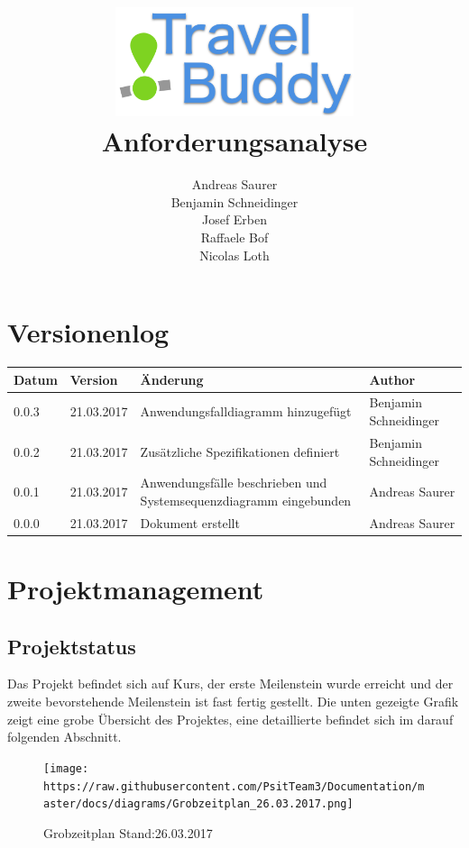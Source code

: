 \documentclass[ngerman,]{article}
\title{\includegraphics[width=7cm]{travel-buddy_white.png}\\Anforderungsanalyse}
\author{Andreas Saurer \\ Benjamin Schneidinger \\ Josef Erben \\ Raffaele Bof \\ Nicolas Loth}
\date{\parbox{\linewidth}{\centering%
      IT15TA ZH \hspace*{3cm} Gruppe 3\endgraf\bigskip
      28.03.2017\endgraf
    }}
\begin{document}
\maketitle
\newpage

{
\hypersetup{linkcolor=black}
\setcounter{tocdepth}{3}
\tableofcontents
}
\newpage
\section{Versionenlog}\label{versionenlog}

\tabulinesep=1.2mm

\begin{longtabu} to \textwidth { | l | l | l | X[l] | }
  \hline
  \textbf{Datum} & \textbf{Version} & \textbf{Änderung} & \textbf{Author} \\
  \hline
  \endhead

  0.0.3 & 21.03.2017 & Anwendungsfalldiagramm hinzugefügt & Benjamin Schneidinger\\
  \hline

  0.0.2 & 21.03.2017 & Zusätzliche Spezifikationen definiert & Benjamin Schneidinger\\
  \hline

  0.0.1 & 21.03.2017 & Anwendungsfälle beschrieben und Systemsequenzdiagramm eingebunden & Andreas Saurer\\
  \hline

  0.0.0 & 21.03.2017 & Dokument erstellt & Andreas Saurer\\
  \hline
\end{longtabu}\newpage

\section{Projektmanagement}\label{projektmanagement}

\subsection{Projektstatus}\label{projektstatus}

Das Projekt befindet sich auf Kurs, der erste Meilenstein wurde erreicht
und der zweite bevorstehende Meilenstein ist fast fertig gestellt. Die
unten gezeigte Grafik zeigt eine grobe Übersicht des Projektes, eine
detaillierte befindet sich im darauf folgenden Abschnitt.

\begin{figure}
\centering
\texttt{[image: https://raw.githubusercontent.com/PsitTeam3/Documentation/master/docs/diagrams/Grobzeitplan\_26.03.2017.png]}
\caption{Grobzeitplan Stand:26.03.2017}
\end{figure}
\end{document}
